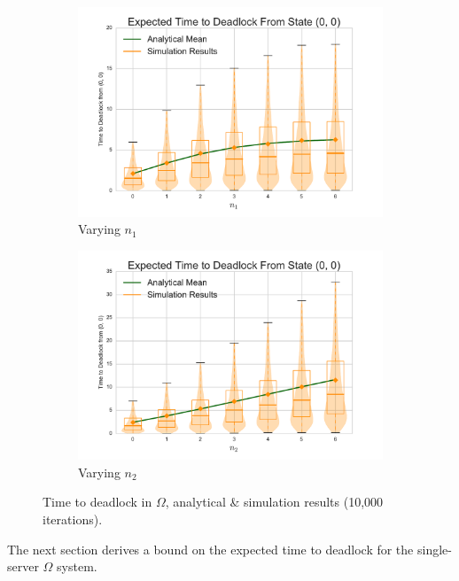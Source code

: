 \documentclass{article}
\numberwithin{equation}{section}
\begin{document}
\begin{figure}[!htbp]
\begin{center}
\begin{subfigure}[b]{0.35\textwidth}
  \includegraphics[width=\textwidth]{images/vary_n1fb}
  \caption{Varying $n_1$}
  \label{fig:timestodeadlockfb_n1}
\end{subfigure}
\begin{subfigure}[b]{0.35\textwidth}
  \includegraphics[width=\textwidth]{images/vary_n2fb}
  \caption{Varying $n_2$}
  \label{fig:timestodeadlockfb_n2}
\end{subfigure}
\end{center}
\caption{Time to deadlock in $\Omega$, analytical \& simulation results (10,000 iterations).}
\label{fig:timestodeadlockfeedback}
\end{figure}



The next section derives a bound on the expected time to deadlock for the single-server $\Omega$ system.
\end{document}

